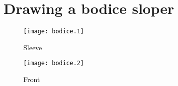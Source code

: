 \documentclass{article}
\begin{document}
\section*{Drawing a bodice sloper}

\begin{figure}[htb]
\begin{center}
\texttt{[image: bodice.1]}
\caption{Sleeve}
\end{center}
\end{figure}

\begin{figure}[htb]
\begin{center}
\texttt{[image: bodice.2]}
\caption{Front}
\end{center}
\end{figure}
\end{document}
